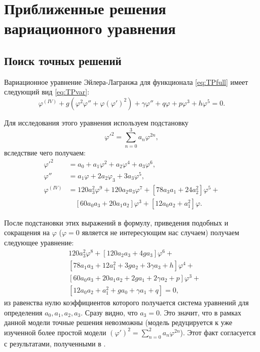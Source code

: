 
\chapter{Приближенные решения вариационного уравнения}\label{ch:solution}

\section{Поиск точных решений}\label{sec:exact}
Вариационное уравнение Эйлера-Лагранжа для функционала \eqref{eq:TPfull} имеет следующий вид \eqref{eq:TPvar}:
\begin{equation*}
\varphi^{(IV)} + 
g\left(\varphi^2\varphi'' + \varphi\left(\varphi'\right)^2\right) +
\gamma\varphi'' + q\varphi + p\varphi^3 + h\varphi^5 = 0.
\label{eq:TPvar_}
\end{equation*}

Для исследования этого уравнения используем подстановку
\begin{equation}
\varphi'^2 = \sum_{n=0}^3 a_n \varphi^{2n},
\label{eq:subst3}
\end{equation}
вследствие чего получаем:
\begin{equation}
\begin{aligned}
\varphi'^2 &= a_0 + a_1\varphi^2 + a_2\varphi^4 + a_3\varphi^6,\\
\varphi'' &= a_1\varphi + 2a_2\varphi_3 + 3a_3\varphi^5, \\
\varphi^{(IV)} &= 120a_3^2\varphi^9 + 120a_2a_3\varphi^7 + 
\left[78a_3a_1 + 24a_2^2\right]\varphi^5 + \\
&\quad\left[60a_0a_3 + 20a_1a_2\right]\varphi^3 +  
\left[12a_0a_2+a_1^2\right]\varphi.
\end{aligned}
\end{equation}

После подстановки этих выражений в формулу, приведения подобных и сокращения на  $\varphi$ ($\varphi = 0$ является не интересующим нас случаем) получаем следующее уравнение:
\begin{equation}\label{}
\begin{aligned}
&120a_3^2\varphi^8 + \left[120a_2a_3 + 4ga_3\right]\varphi^6 + \\
&\left[78a_1a_3 + 12a_1^2 + 3ga_2 + 3\gamma a_3 +h\right]\varphi^4 + \\
&\left[60a_0a_3 + 20a_1a_2 + 2ga_1 + 2\gamma a_2 + p\right]\varphi^3 + \\
&\left[12a_0a_2 + a_1^2 + ga_0 + \gamma a_1 + q\right] = 0,
\end{aligned}
\end{equation}
из равенства нулю коэффициентов которого получается система уравнений для определения $a_0, a_1, a_2, a_3$. Сразу видно, что $a_3=0$. Это значит, что в рамках данной модели точные решения невозможны (модель редуцируется к уже изученной более простой модели $\left(\varphi'\right)^2 = \sum_{n=0}^2 a_n \varphi^{2n}$). Этот факт согласуется с результатами, полученными в \cite{Berezovsky1998}.

